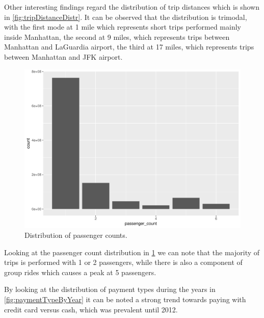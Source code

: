 \documentclass{acm_proc_article-sp-sigmod09}
\begin{document}
Other interesting findings regard the distribution of trip distances which is shown in \cref{fig:tripDistanceDistr}. It can be observed that the distribution is trimodal, with the first mode at 1 mile which represents short trips performed mainly inside Manhattan, the second at 9 miles, which represents trips between Manhattan and LaGuardia airport, the third at 17 miles, which represents trips between Manhattan and JFK airport.

\begin{figure}
	\centering
	\includegraphics[width=1\columnwidth]{resources/base_plots/passenger_count_dist.pdf}
	\caption{Distribution of passenger counts.}
	\label{fig:passengerCountDistr}
\end{figure}

Looking at the passenger count distribution in \cref{fig:passengerCountDistr} we can note that the majority of trips is performed with 1 or 2 passengers, while there is also a component of group rides which causes a peak at 5 passengers.

By looking at the distribution of payment types during the years in \cref{fig:paymentTypeByYear} it can be noted a strong trend towards paying with credit card versus cash, which was prevalent until 2012.
\end{document}
